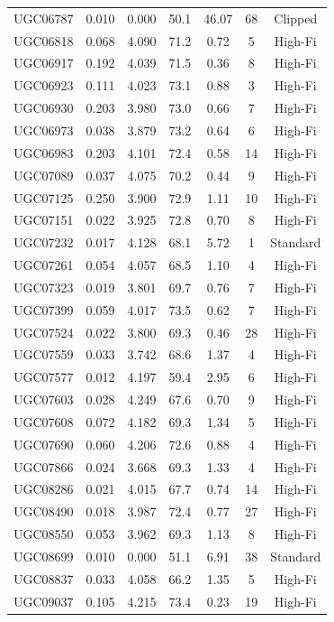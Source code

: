 \begin{longtable}{lcccccc}
UGC06787 & 0.010 & 0.000 & 50.1 & 46.07 & 68 & Clipped \\
UGC06818 & 0.068 & 4.090 & 71.2 & 0.72 & 5 & High-Fi \\
UGC06917 & 0.192 & 4.039 & 71.5 & 0.36 & 8 & High-Fi \\
UGC06923 & 0.111 & 4.023 & 73.1 & 0.88 & 3 & High-Fi \\
UGC06930 & 0.203 & 3.980 & 73.0 & 0.66 & 7 & High-Fi \\
UGC06973 & 0.038 & 3.879 & 73.2 & 0.64 & 6 & High-Fi \\
UGC06983 & 0.203 & 4.101 & 72.4 & 0.58 & 14 & High-Fi \\
UGC07089 & 0.037 & 4.075 & 70.2 & 0.44 & 9 & High-Fi \\
UGC07125 & 0.250 & 3.900 & 72.9 & 1.11 & 10 & High-Fi \\
UGC07151 & 0.022 & 3.925 & 72.8 & 0.70 & 8 & High-Fi \\
UGC07232 & 0.017 & 4.128 & 68.1 & 5.72 & 1 & Standard \\
UGC07261 & 0.054 & 4.057 & 68.5 & 1.10 & 4 & High-Fi \\
UGC07323 & 0.019 & 3.801 & 69.7 & 0.76 & 7 & High-Fi \\
UGC07399 & 0.059 & 4.017 & 73.5 & 0.62 & 7 & High-Fi \\
UGC07524 & 0.022 & 3.800 & 69.3 & 0.46 & 28 & High-Fi \\
UGC07559 & 0.033 & 3.742 & 68.6 & 1.37 & 4 & High-Fi \\
UGC07577 & 0.012 & 4.197 & 59.4 & 2.95 & 6 & High-Fi \\
UGC07603 & 0.028 & 4.249 & 67.6 & 0.70 & 9 & High-Fi \\
UGC07608 & 0.072 & 4.182 & 69.3 & 1.34 & 5 & High-Fi \\
UGC07690 & 0.060 & 4.206 & 72.6 & 0.88 & 4 & High-Fi \\
UGC07866 & 0.024 & 3.668 & 69.3 & 1.33 & 4 & High-Fi \\
UGC08286 & 0.021 & 4.015 & 67.7 & 0.74 & 14 & High-Fi \\
UGC08490 & 0.018 & 3.987 & 72.4 & 0.77 & 27 & High-Fi \\
UGC08550 & 0.053 & 3.962 & 69.3 & 1.13 & 8 & High-Fi \\
UGC08699 & 0.010 & 0.000 & 51.1 & 6.91 & 38 & Standard \\
UGC08837 & 0.033 & 4.058 & 66.2 & 1.35 & 5 & High-Fi \\
UGC09037 & 0.105 & 4.215 & 73.4 & 0.23 & 19 & High-Fi \\

\end{longtable}
